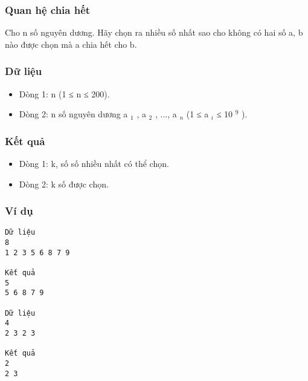 



\subsubsection{   Quan hệ chia hết  }

   Cho n số nguyên dương. Hãy chọn ra nhiều số nhất sao cho không có hai số a, b nào được chọn mà a chia hết cho b.  

\subsubsection{   Dữ liệu  }
\begin{itemize}
	\item     Dòng 1: n (1 ≤ n ≤ 200).   
	\item     Dòng 2: n số nguyên dương a    $_     1    $    , a    $_     2    $    , ..., a    $_     n    $    (1 ≤ a    $_     i    $    ≤ 10    $^     9    $    ).   
\end{itemize}

\subsubsection{   Kết quả  }
\begin{itemize}
	\item     Dòng 1: k, số số nhiều nhất có thể chọn.   
	\item     Dòng 2: k số được chọn.   
\end{itemize}

\subsubsection{   Ví dụ  }
\begin{verbatim}
Dữ liệu
8
1 2 3 5 6 8 7 9

Kết quả
5
5 6 8 7 9

Dữ liệu
4
2 3 2 3

Kết quả
2
2 3
\end{verbatim}